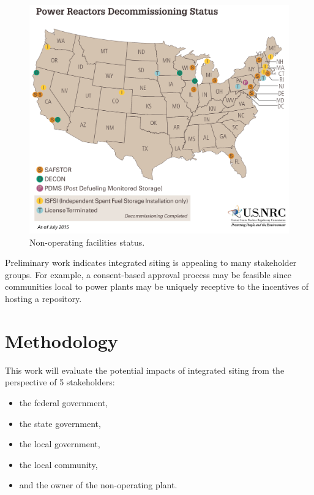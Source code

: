 \documentclass{anstrans}
\begin{document}
\begin{figure}[h!] 
  \centering
  \includegraphics[width=0.8\columnwidth]{power-reactors-decommissioning}
  \caption{Non-operating facilities status\cite{nuclear_regulatory_commission_nrc_2015}.}
  \label{fig:shutdown}
\end{figure}

Preliminary work \cite{waleed_regional_2015} indicates integrated siting is 
appealing to many stakeholder groups. For example, a consent-based approval 
process may be feasible since communities local to power plants may be uniquely 
receptive to the incentives of hosting a repository.  


\section{Methodology}

This work will evaluate the potential impacts of integrated siting from the 
perspective of 5 stakeholders:

\begin{itemize}
        \item the federal government,
        \item the state government,
        \item the local government,
        \item the local community,
        \item and the owner of the non-operating plant.
\end{itemize}
\end{document}
